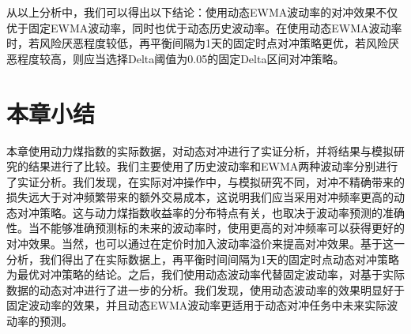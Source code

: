 从以上分析中，我们可以得出以下结论：使用动态EWMA波动率的对冲效果不仅优于固定EWMA波动率，同时也优于动态历史波动率。在使用动态EWMA波动率时，若风险厌恶程度较低，再平衡间隔为1天的固定时点对冲策略更优，若风险厌恶程度较高，则应当选择Delta阈值为0.05的固定Delta区间对冲策略。

\section{本章小结}

本章使用动力煤指数的实际数据，对动态对冲进行了实证分析，并将结果与模拟研究的结果进行了比较。我们主要使用了历史波动率和EWMA两种波动率分别进行了实证分析。我们发现，在实际对冲操作中，与模拟研究不同，对冲不精确带来的损失远大于对冲频繁带来的额外交易成本，这说明我们应当采用对冲频率更高的动态对冲策略。这与动力煤指数收益率的分布特点有关，也取决于波动率预测的准确性。当不能够准确预测标的未来的波动率时，使用更高的对冲频率可以获得更好的对冲效果。当然，也可以通过在定价时加入波动率溢价来提高对冲效果。基于这一分析，我们得出了在实际数据上，再平衡时间间隔为1天的固定时点动态对冲策略为最优对冲策略的结论。之后，我们使用动态波动率代替固定波动率，对基于实际数据的动态对冲进行了进一步的分析。我们发现，使用动态波动率的效果明显好于固定波动率的效果，并且动态EWMA波动率更适用于动态对冲任务中未来实际波动率的预测。
